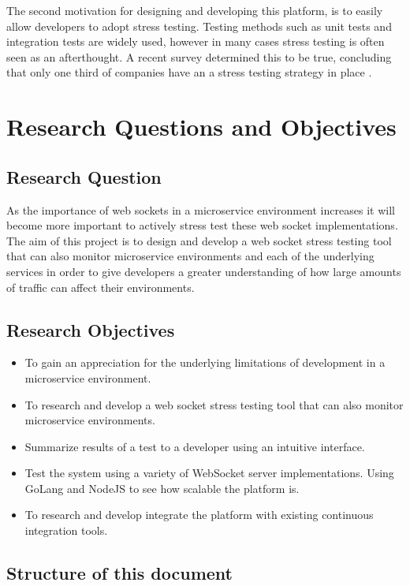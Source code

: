 The second motivation for designing and developing this platform, is to easily allow developers to adopt stress testing. Testing methods such as unit tests and integration tests are widely used, however in many cases stress testing is often seen as an afterthought. A recent survey determined this to be true, concluding that only one third of companies have an a stress testing strategy in place \cite{bezemer2019performance}.

\section{Research Questions and Objectives}

\subsection{Research Question}

As the importance of web sockets in a microservice environment increases it will become more important to actively stress test these web socket implementations. The aim of this project is to design and develop a web socket stress testing tool that can also monitor microservice environments and each of the underlying services in order to give developers a greater understanding of how large amounts of traffic can affect their environments.

\subsection{Research Objectives}

\begin{itemize}
  \item To gain an appreciation for the underlying limitations of development in a microservice environment.
  \item To research and develop a web socket stress testing tool that can also monitor microservice environments.
  \item Summarize results of a test to a developer using an intuitive interface.
  \item Test the system using a variety of WebSocket server implementations. Using GoLang and NodeJS to see how scalable the platform is.
  \item To research and develop integrate the platform with existing continuous integration tools.
\end{itemize}

\subsection{Structure of this document}

